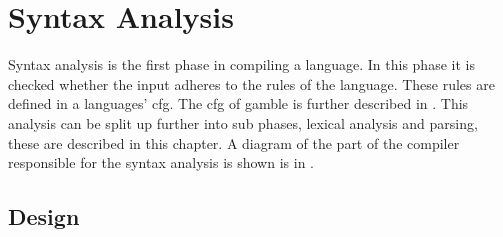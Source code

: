 \chapter{Syntax Analysis}\label{sec:syntaxAnalysis}
Syntax analysis is the first phase in compiling a language.
In this phase it is checked whether the input adheres to the rules of the language.
These rules are defined in a languages' \acrshort{cfg}.
The \acrshort{cfg} of \gls{gamble} is further described in .
This analysis can be split up further into sub phases, lexical analysis and parsing, these are described in this chapter.
A diagram of the part of the compiler responsible for the syntax analysis is shown is in .


\section{Design}








